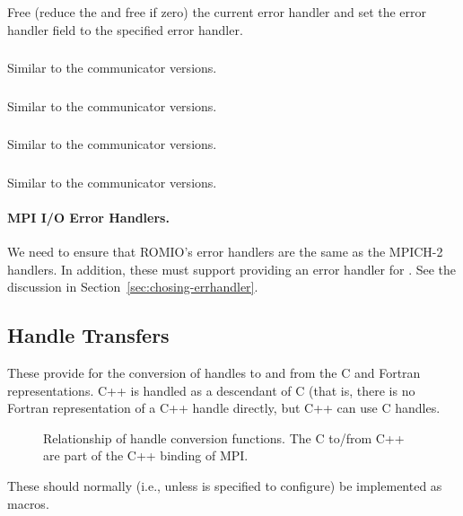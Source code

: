 \documentclass{article}
\begin{document}
Free (reduce the  and free if zero) the current error handler
and set the error handler field to the specified error handler.

\subsubsection{}
Similar to the communicator versions.

\subsubsection{}
Similar to the communicator versions.

\subsubsection{}
Similar to the communicator versions.

\subsubsection{}
Similar to the communicator versions.

\paragraph{MPI I/O Error Handlers.}
We need to ensure that ROMIO's error handlers are the same as the MPICH-2
handlers.  In addition, these must support providing an error handler for
.  See the discussion in
Section~\ref{sec:chosing-errhandler}. 

\subsection{Handle Transfers}
\label{sec:handle-transfer}
These provide for the conversion of handles to and from the C and
Fortran representations.  C++ is handled as a descendant of C (that
is, there is no Fortran representation of a C++ handle directly, but
C++ can use C handles.  
\begin{figure}
\centerline{}
\caption{Relationship of handle conversion functions.  The C to/from
C++ are part of the C++ binding of MPI.}\label{fig:handle-transfers}
\end{figure}
These should normally (i.e., unless
 is
specified to configure) be implemented as macros.  
\end{document}
